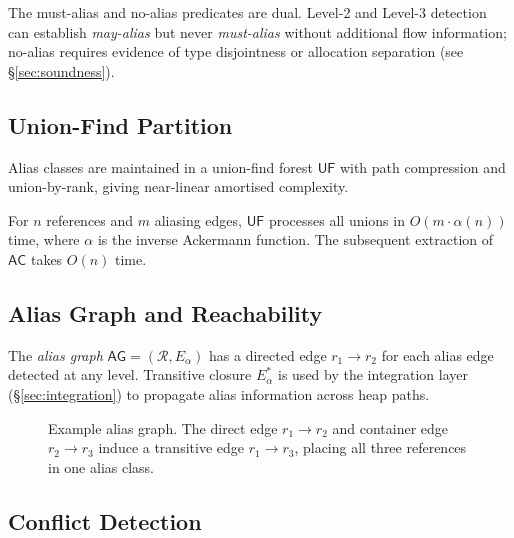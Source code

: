 \documentclass[11pt]{article}
\newcommand{\AliasCls}{\mathsf{AC}}         %
\newcommand{\UF}{\mathsf{UF}}               %
\newcommand{\AliasGraph}{\mathsf{AG}}       %
\begin{document}
\begin{remark}
  The must-alias and no-alias predicates are dual.  Level-2 and Level-3
  detection can establish \emph{may-alias} but never \emph{must-alias}
  without additional flow information; no-alias requires evidence of
  type disjointness or allocation separation (see
  \S\ref{sec:soundness}).
\end{remark}

\subsection{Union-Find Partition}

Alias classes are maintained in a union-find forest $\UF$ with path
compression and union-by-rank, giving near-linear amortised complexity.

\begin{proposition}
  \label{prop:uf-complexity}
  For $n$ references and $m$ aliasing edges, $\UF$ processes all unions
  in $O(m \cdot \alpha(n))$ time, where $\alpha$ is the inverse
  Ackermann function.  The subsequent extraction of $\AliasCls$ takes
  $O(n)$ time.
\end{proposition}

\subsection{Alias Graph and Reachability}

The \emph{alias graph} $\AliasGraph = (\mathcal{R}, E_\alpha)$ has a
directed edge $r_1 \to r_2$ for each alias edge detected at any level.
Transitive closure $E_\alpha^*$ is used by the integration layer
(\S\ref{sec:integration}) to propagate alias information across heap
paths.

\begin{figure}[t]
  \centering
  \caption{Example alias graph.  The direct edge $r_1\to r_2$ and
  container edge $r_2\to r_3$ induce a transitive edge $r_1\to r_3$,
  placing all three references in one alias class.}
  \label{fig:alias-graph}
\end{figure}

\subsection{Conflict Detection}
\end{document}
